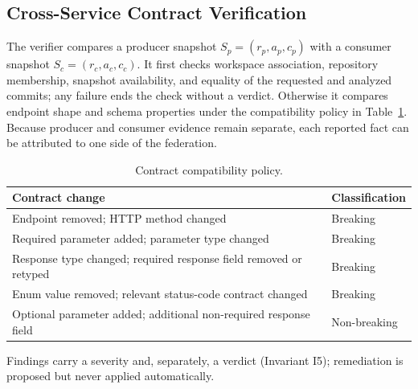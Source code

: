 \documentclass[runningheads]{llncs}
\begin{document}
\subsection{Cross-Service Contract Verification}
The verifier compares a producer snapshot $S_p = (r_p, a_p, c_p)$ with a consumer snapshot $S_c = (r_c, a_c, c_c)$. It first checks workspace association, repository membership, snapshot availability, and equality of the requested and analyzed commits; any failure ends the check without a verdict. Otherwise it compares endpoint shape and schema properties under the compatibility policy in Table~\ref{tab:contracts}. Because producer and consumer evidence remain separate, each reported fact can be attributed to one side of the federation.

\begin{table}[t]
\centering
\caption{Contract compatibility policy.}
\label{tab:contracts}
\begin{tabular}{p{8cm}p{3cm}}
\toprule
\textbf{Contract change} & \textbf{Classification} \\
\midrule
Endpoint removed; HTTP method changed & Breaking \\
Required parameter added; parameter type changed & Breaking \\
Response type changed; required response field removed or retyped & Breaking \\
Enum value removed; relevant status-code contract changed & Breaking \\
Optional parameter added; additional non-required response field & Non-breaking \\
\bottomrule
\end{tabular}
\end{table}

Findings carry a severity and, separately, a verdict (Invariant I5); remediation is proposed but never applied automatically.
\end{document}
